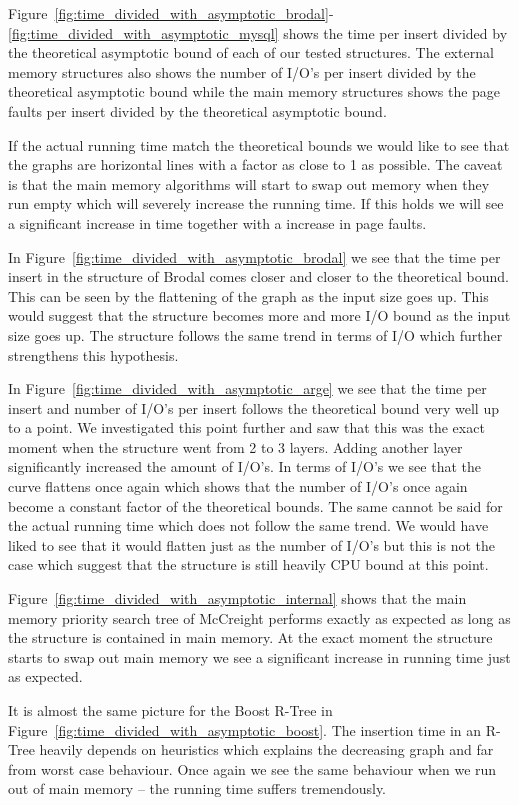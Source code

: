\documentclass[twoside,11pt,openright]{report}
\begin{document}
Figure~\ref{fig:time_divided_with_asymptotic_brodal}-\ref{fig:time_divided_with_asymptotic_mysql} shows the time per insert divided by the theoretical asymptotic bound of each of our tested structures. The external memory structures also shows the number of I/O's per insert divided by the theoretical asymptotic bound while the main memory structures shows the page faults per insert divided by the theoretical asymptotic bound. 

If the actual running time match the theoretical bounds we would like to see that the graphs are horizontal lines with a factor as close to 1 as possible. The caveat is that the main memory algorithms will start to swap out memory when they run empty which will severely increase the running time. If this holds we will see a significant increase in time together with a increase in page faults.

In Figure~\ref{fig:time_divided_with_asymptotic_brodal} we see that the time per insert in the structure of Brodal comes closer and closer to the theoretical bound. This can be seen by the flattening of the graph as the input size goes up. This would suggest that the structure becomes more and more I/O bound as the input size goes up. The structure follows the same trend in terms of I/O which further strengthens this hypothesis.

In Figure~\ref{fig:time_divided_with_asymptotic_arge} we see that the time per insert and number of I/O's per insert follows the theoretical bound very well up to a point. We investigated this point further and saw that this was the exact moment when the structure went from 2 to 3 layers. Adding another layer significantly increased the amount of I/O's. In terms of I/O's we see that the curve flattens once again which shows that the number of I/O's once again become a constant factor of the theoretical bounds. The same cannot be said for the actual running time which does not follow the same trend. We would have liked to see that it would flatten just as the number of I/O's but this is not the case which suggest that the structure is still heavily CPU bound at this point.

Figure~\ref{fig:time_divided_with_asymptotic_internal} shows that the main memory priority search tree of McCreight performs exactly as expected as long as the structure is contained in main memory. At the exact moment the structure starts to swap out main memory we see a significant increase in running time just as expected.

It is almost the same picture for the Boost R-Tree in Figure~\ref{fig:time_divided_with_asymptotic_boost}. The insertion time in an R-Tree heavily depends on heuristics which explains the decreasing graph and far from worst case behaviour. Once again we see the same behaviour when we run out of main memory -- the running time suffers tremendously.
\end{document}
